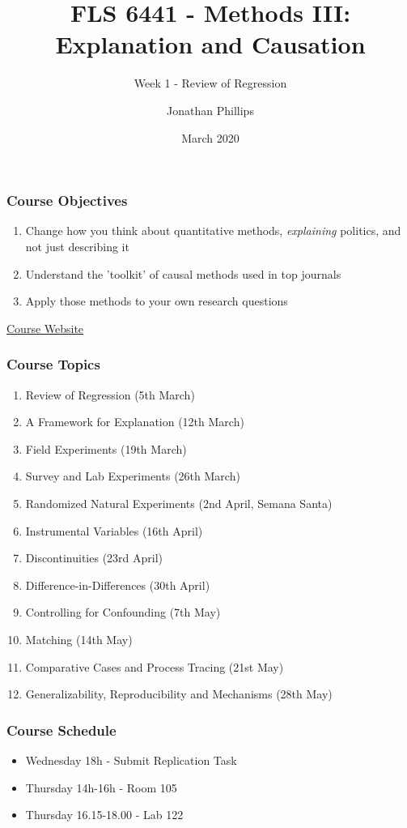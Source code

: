 \documentclass[xcolor=x11names,compress]{beamer}\usepackage[]{graphicx}\usepackage[]{color}
\title{FLS 6441 - Methods III: Explanation and Causation}
\subtitle{Week 1 - Review of Regression}
\author{Jonathan Phillips}
\date{March 2020}
\renewcommand{\(}{\begin{columns}}
\renewcommand{\)}{\end{columns}}
\newcommand{\<}[1]{\begin{column}{#1}}
\renewcommand{\>}{\end{column}}
\begin{document}
\frame{\titlepage}

\begin{frame}
\frametitle{Course Objectives}
\begin{enumerate}
\item Change how you think about quantitative methods, \textit{explaining} politics, and not just describing it
\pause
\item Understand the 'toolkit' of causal methods used in top journals
\pause
\item Apply those methods to your own research questions
\pause
\end{enumerate}
\begin{center}
\href{https://jonnyphillips.github.io/Methods_III}{Course Website}
\end{center}
\end{frame}

\begin{frame}
\frametitle{Course Topics}
\begin{enumerate}
\item Review of Regression (5th March)
\pause
\item A Framework for Explanation (12th March)
\pause
\item Field Experiments (19th March)
\item Survey and Lab Experiments (26th March)
\item Randomized Natural Experiments (2nd April, Semana Santa)
\pause
\item Instrumental Variables (16th April)
\item Discontinuities (23rd April)
\pause
\item Difference-in-Differences (30th April)
\item Controlling for Confounding (7th May)
\item Matching (14th May)
\item Comparative Cases and Process Tracing (21st May)
\pause
\item Generalizability, Reproducibility and Mechanisms (28th May)
\end{enumerate}
\end{frame}

\begin{frame}
\frametitle{Course Schedule}
\begin{itemize}
\item Wednesday 18h - Submit Replication Task
\pause
\item Thursday 14h-16h - Room 105
\pause
\item Thursday 16.15-18.00 - Lab 122
\end{itemize}
\end{frame}
\end{document}
